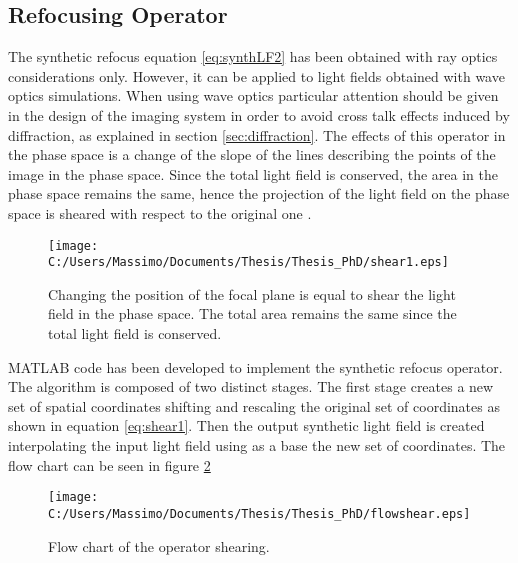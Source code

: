 \subsection{Refocusing Operator}
The synthetic refocus equation \ref{eq:synthLF2} has been obtained with ray optics considerations only. However, it can be applied to light fields obtained with wave optics simulations. When using wave optics particular attention should be given in the design of the imaging system in order to avoid cross talk effects induced by diffraction, as explained in section \ref{sec:diffraction}. The effects of this operator in the phase space is a change of the slope of the lines describing the points of the image in the phase space. Since the total light field is conserved, the area in the phase space remains the same, hence the projection of the light field on the phase space is sheared with respect to the original one \cite{georgiev2010focused}.
\begin{figure}[H]
	\centering
	\texttt{[image: C:/Users/Massimo/Documents/Thesis/Thesis\_PhD/shear1.eps]}
	\caption{\label{fig:shear1} Changing the position of the focal plane is equal to shear the light field in the phase space. The total area remains the same since the total light field is conserved. }
\end{figure}
 MATLAB code has been developed to implement the synthetic refocus operator. The algorithm is composed of two distinct stages. The first stage creates a new set of spatial coordinates shifting and rescaling the original set of coordinates as shown in equation \ref{eq:shear1}. Then the output synthetic light field is created interpolating the input light field using as a base the new set of coordinates. The flow chart can be seen in figure \ref{fig:flowcharet1}

\begin{figure}[H]
	\centering
	\texttt{[image: C:/Users/Massimo/Documents/Thesis/Thesis\_PhD/flowshear.eps]}
	\caption{\label{fig:flowcharet1} Flow chart of the operator shearing. }
\end{figure} 
